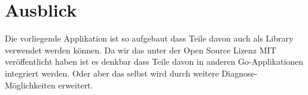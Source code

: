 \section*{Ausblick}
Die vorliegende Applikation ist so aufgebaut dass Teile davon auch als Library verwendet werden können. Da wir das \tool unter der Open Source Lizenz MIT veröffentlicht haben ist es denkbar dass Teile davon in anderen Go-Applikationen integriert werden. Oder aber das \tool selbst wird durch weitere Diagnose-Möglichkeiten erweitert.